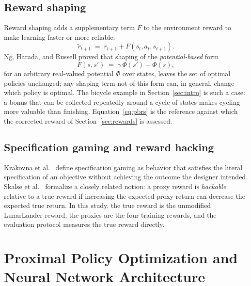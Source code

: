 \documentclass[11pt,a4paper]{article}
\begin{document}
\subsection{Reward shaping}

Reward shaping adds a supplementary term $F$ to the environment reward to make learning faster or more reliable:
\begin{equation}
  \tilde r_{t+1} \;=\; r_{t+1} + F(s_t, a_t, s_{t+1}). \label{eq:shaping}
\end{equation}
Ng, Harada, and Russell \cite{ng1999} proved that shaping of the \emph{potential-based} form
\begin{equation}
  F(s,s') \;=\; \gamma\,\Phi(s') - \Phi(s), \label{eq:pbrs}
\end{equation}
for an arbitrary real-valued potential $\Phi$ over states, leaves the set of optimal policies unchanged; any shaping term not of this form can, in general, change which policy is optimal. The bicycle example in Section~\ref{sec:intro} is such a case: a bonus that can be collected repeatedly around a cycle of states makes cycling more valuable than finishing. Equation~\eqref{eq:pbrs} is the reference against which the corrected reward of Section~\ref{sec:rewards} is assessed.

\subsection{Specification gaming and reward hacking}

Krakovna et al.\ \cite{krakovna2020} define specification gaming as behavior that satisfies the literal specification of an objective without achieving the outcome the designer intended. Skalse et al.\ \cite{skalse2022} formalize a closely related notion: a proxy reward is \emph{hackable} relative to a true reward if increasing the expected proxy return can decrease the expected true return. In this study, the true reward is the unmodified LunarLander reward, the proxies are the four training rewards, and the evaluation protocol measures the true reward directly.

\section{Proximal Policy Optimization and Neural Network Architecture}\label{sec:ppo}
\end{document}

